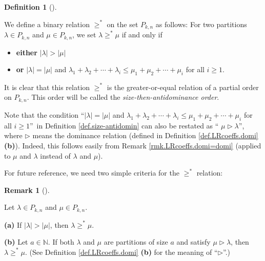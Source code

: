 \documentclass[numbers=enddot,12pt,final,onecolumn,notitlepage]{scrartcl}%
\theoremstyle{definition}
\newtheorem{defi}[theo]{Definition}
\newenvironment{definition}[1][]
{\begin{defi}[#1]\begin{leftbar}}
{\end{leftbar}\end{defi}}
\newtheorem{remk}[theo]{Remark}
\newenvironment{remark}[1][]
{\begin{remk}[#1]\begin{leftbar}}
{\end{leftbar}\end{remk}}
\begin{document}
\begin{definition}
\label{def.size-antidomin}We define a binary relation $\geq^{\ast}$ on the set
$P_{k,n}$ as follows: For two partitions $\lambda\in P_{k,n}$ and $\mu\in
P_{k,n}$, we set $\lambda\geq^{\ast}\mu$ if and only if

\begin{itemize}
\item \textbf{either} $\left\vert \lambda\right\vert >\left\vert
\mu\right\vert $

\item \textbf{or} $\left\vert \lambda\right\vert =\left\vert \mu\right\vert $
and $\lambda_{1}+\lambda_{2}+\cdots+\lambda_{i}\leq\mu_{1}+\mu_{2}+\cdots
+\mu_{i}$ for all $i\geq1$.
\end{itemize}

It is clear that this relation $\geq^{\ast}$ is the greater-or-equal relation
of a partial order on $P_{k,n}$. This order will be called the
\textit{size-then-antidominance order}.
\end{definition}

Note that the condition \textquotedblleft$\left\vert \lambda\right\vert
=\left\vert \mu\right\vert $ and $\lambda_{1}+\lambda_{2}+\cdots+\lambda
_{i}\leq\mu_{1}+\mu_{2}+\cdots+\mu_{i}$ for all $i\geq1$\textquotedblright\ in
Definition \ref{def.size-antidomin} can also be restated as \textquotedblleft%
$\mu\triangleright\lambda$\textquotedblright, where $\triangleright$ means the
dominance relation (defined in Definition \ref{def.LRcoeffs.domi}
\textbf{(b)}). Indeed, this follows easily from Remark
\ref{rmk.LRcoeffs.domi=domi} (applied to $\mu$ and $\lambda$ instead of
$\lambda$ and $\mu$).

For future reference, we need two simple criteria for the $\geq^{\ast}$ relation:

\begin{remark}
\label{rmk.size-antidomin.domin}Let $\lambda\in P_{k,n}$ and $\mu\in P_{k,n}$.

\textbf{(a)} If $\left\vert \lambda\right\vert >\left\vert \mu\right\vert $,
then $\lambda\geq^{\ast}\mu$.

\textbf{(b)} Let $a\in\mathbb{N}$. If both $\lambda$ and $\mu$ are partitions
of size $a$ and satisfy $\mu\triangleright\lambda$, then $\lambda\geq^{\ast
}\mu$. (See Definition \ref{def.LRcoeffs.domi} \textbf{(b)} for the meaning of
\textquotedblleft$\triangleright$\textquotedblright.)
\end{remark}
\end{document}

